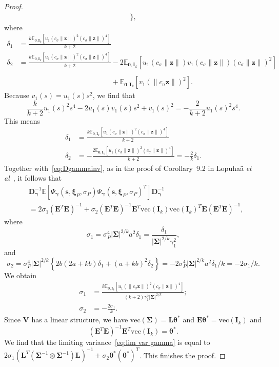 \documentclass{article}
\numberwithin{equation}{section}
\theoremstyle{plain}
\newcommand{\vc}{\mathrm{vec}}
\newcommand{\btheta}{\bm\theta}
\newcommand{\bxi}{\bm\xi}
\newcommand{\bgamma}{\bm\gamma}
\newcommand{\bSigma}{\mathbf{\Sigma}}
\newcommand{\bz}{\mathbf{z}}
\newcommand{\bV}{\mathbf{V}}
\newcommand{\bI}{\mathbf{I}}
\newcommand{\bD}{\mathbf{D}}
\newcommand{\bL}{\mathbf{L}}
\newcommand{\bE}{\mathbf{E}}
\newcommand{\E}{\mathbb{E}}
\begin{document}
\begin{proof}
\[\begin{split}
\Big\},
\end{split}
\]
where 
\[
\begin{split}
\delta_1
&=
\frac{k\E_{\mathbf{0},\bI_k}\left[u_1(c_\sigma\|\bz\|)^2(c_\sigma\|\bz\|)^4\right]}{k+2}\\
\delta_2
&=
\frac{k\E_{\mathbf{0},\bI_k}\left[u_1(c_\sigma\|\bz\|)^2(c_\sigma\|\bz\|)^4\right]}{k+2}
-
2\E_{\mathbf{0},\bI_k}\left[u_1(c_\sigma\|\bz\|)v_1(c_\sigma\|\bz\|)(c_\sigma\|\bz\|)^2\right]\\
&\phantom{= \frac{k\E_{\mathbf{0},\bI_k}\left[u_1(c_\sigma\|\bz\|)^2(c_\sigma\|\bz\|)^4\right]}{k+2}}
+
\E_{\mathbf{0},\bI_k}\left[v_1(\|c_\sigma\bz\|)^2\right].
\end{split}
\]
Because $v_1(s)=u_1(s)s^2$, we find that
\[
\frac{k}{k+2}u_1(s)^2s^4
-
2u_1(s)v_1(s)s^2
+
v_1(s)^2
=
-\frac{2}{k+2}u_1(s)^2s^4.
\]
This means
\begin{equation}
\label{def:delta12}
\begin{split}
\delta_1
&=
\frac{k\E_{\mathbf{0},\bI_k}\left[u_1(c_\sigma\|\bz\|)^2(c_\sigma\|\bz\|)^4\right]}{k+2}\\
\delta_2
&=
-
\frac{2\E_{\mathbf{0},\bI_k}\left[u_1(c_\sigma\|\bz\|)^2(c_\sigma\|\bz\|)^4\right]}{k+2}
=
-\frac{2}{k}\delta_1.
\end{split}
\end{equation}
Together with~\eqref{eq:Dgammainv}, 
as in the proof of Corollary~9.2 in Lopuha\"a \emph{et al}~\cite{lopuhaa-gares-ruizgazen2023},
it follows that
\[
\begin{split}
&
\bD_{\bgamma}^{-1}
\E\left[
\Psi_{\bgamma}(\mathbf{s},\bxi_P,\sigma_P)\Psi_{\bgamma}(\mathbf{s},\bxi_P,\sigma_P)^T
\right]
\bD_{\bgamma}^{-1}\\
&=
2\sigma_1(\bE^T\bE)^{-1}
+
\sigma_2(\bE^T\bE)^{-1}\bE^T\vc(\bI_k)
\vc(\bI_k)^T
\bE(\bE^T\bE)^{-1},
\end{split}
\]
where 
\[
\sigma_1
=
\sigma_P^4|\bSigma|^{2/k}a^2\delta_1
=
\frac{\delta_1}{|\bSigma|^{2/k}\gamma_1^2},
\]
and 
\[
\sigma_2
=
\sigma_P^4|\bSigma|^{2/k}
\left\{
2b(2a+kb)\delta_1+(a+kb)^2\delta_2
\right\}
=
-2\sigma_P^4|\bSigma|^{2/k}a^2\delta_1/k
=
-2\sigma_1/k.
\]
We obtain
\begin{equation}
\label{def:sigma12}
\begin{split}
\sigma_1
&=
\frac{k\E_{\mathbf{0},\bI_k}\left[u_1(\|c_\sigma\bz\|)^2(c_\sigma\|\bz\|)^4\right]}{(k+2)\gamma_1^2|\bSigma|^{2/k}};\\
\sigma_2
&=
-\frac{2\sigma_1}{k}.
\end{split}
\end{equation}
Since $\bV$ has a linear structure, we have $\vc(\bSigma)=\bL\btheta^*$
and $\bE\btheta^*=\vc(\bI_k)$ and 
\[
(\bE^T\bE)^{-1}\bE^T\vc(\bI_k)=\btheta^*.
\]
We find that the limiting variance~\eqref{eq:lim var gamma} is equal to
$2\sigma_1
(\bL^T(\bSigma^{-1}\otimes\bSigma^{-1})\bL)^{-1}
+
\sigma_2
\btheta^*(\btheta^*)^T$.
This finishes the proof.
\end{proof}
\end{document}
